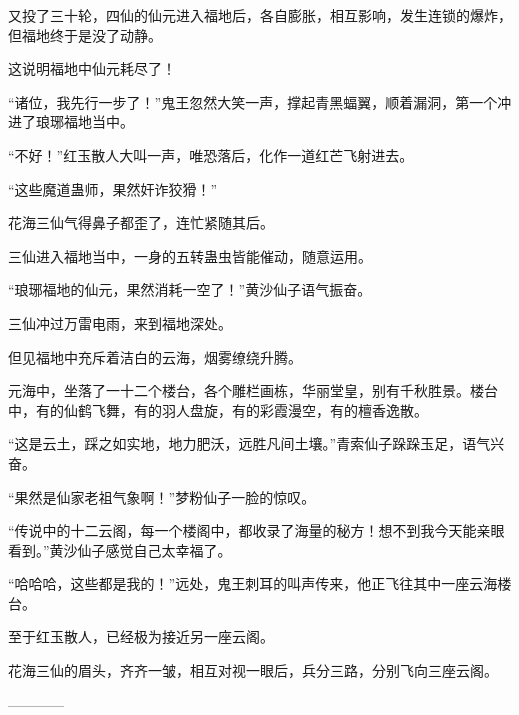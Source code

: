\begin{this_body}
又投了三十轮，四仙的仙元进入福地后，各自膨胀，相互影响，发生连锁的爆炸，但福地终于是没了动静。

这说明福地中仙元耗尽了！

“诸位，我先行一步了！”鬼王忽然大笑一声，撑起青黑蝠翼，顺着漏洞，第一个冲进了琅琊福地当中。

“不好！”红玉散人大叫一声，唯恐落后，化作一道红芒飞射进去。

“这些魔道蛊师，果然奸诈狡猾！”

花海三仙气得鼻子都歪了，连忙紧随其后。

三仙进入福地当中，一身的五转蛊虫皆能催动，随意运用。

“琅琊福地的仙元，果然消耗一空了！”黄沙仙子语气振奋。

三仙冲过万雷电雨，来到福地深处。

但见福地中充斥着洁白的云海，烟雾缭绕升腾。

元海中，坐落了一十二个楼台，各个雕栏画栋，华丽堂皇，别有千秋胜景。楼台中，有的仙鹤飞舞，有的羽人盘旋，有的彩霞漫空，有的檀香逸散。

“这是云土，踩之如实地，地力肥沃，远胜凡间土壤。”青索仙子跺跺玉足，语气兴奋。

“果然是仙家老祖气象啊！”梦粉仙子一脸的惊叹。

“传说中的十二云阁，每一个楼阁中，都收录了海量的秘方！想不到我今天能亲眼看到。”黄沙仙子感觉自己太幸福了。

“哈哈哈，这些都是我的！”远处，鬼王刺耳的叫声传来，他正飞往其中一座云海楼台。

至于红玉散人，已经极为接近另一座云阁。

花海三仙的眉头，齐齐一皱，相互对视一眼后，兵分三路，分别飞向三座云阁。

------------

\end{this_body}

